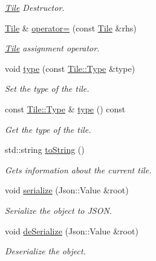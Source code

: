 \begin{DoxyCompactItemize}
\begin{DoxyCompactList}\small\item\em \hyperlink{class_tile}{Tile} Destructor. \end{DoxyCompactList}\item 
\hyperlink{class_tile}{Tile} \& \hyperlink{class_tile_a2e2c020a03afc0cdbe98170a05066d9a}{operator=} (const \hyperlink{class_tile}{Tile} \&rhs)
\begin{DoxyCompactList}\small\item\em \hyperlink{class_tile}{Tile} assignment operator. \end{DoxyCompactList}\item 
void \hyperlink{class_tile_af6644c418cbb05f4af1bb0bae756a96f}{type} (const \hyperlink{class_tile_afa5ef05a7f2ea1f3e44398c001abc738}{Tile\-::\-Type} \&type)
\begin{DoxyCompactList}\small\item\em Set the type of the tile. \end{DoxyCompactList}\item 
const \hyperlink{class_tile_afa5ef05a7f2ea1f3e44398c001abc738}{Tile\-::\-Type} \& \hyperlink{class_tile_a816fb8e2d8d48619eccf6e225eca7206}{type} () const 
\begin{DoxyCompactList}\small\item\em Get the type of the tile. \end{DoxyCompactList}\item 
std\-::string \hyperlink{class_tile_acc5f775cb013360f669f5043cbf60cb2}{to\-String} ()
\begin{DoxyCompactList}\small\item\em Gets information about the current tile. \end{DoxyCompactList}\item 
\hypertarget{class_tile_a236311185e4c94d0ceb21bb6d122c4f8}{void \hyperlink{class_tile_a236311185e4c94d0ceb21bb6d122c4f8}{serialize} (Json\-::\-Value \&root)}\label{class_tile_a236311185e4c94d0ceb21bb6d122c4f8}

\begin{DoxyCompactList}\small\item\em Serialize the object to J\-S\-O\-N. \end{DoxyCompactList}\item 
\hypertarget{class_tile_aac6ff96901aa89ac87b1a8385dc6444d}{void \hyperlink{class_tile_aac6ff96901aa89ac87b1a8385dc6444d}{de\-Serialize} (Json\-::\-Value \&root)}\label{class_tile_aac6ff96901aa89ac87b1a8385dc6444d}

\begin{DoxyCompactList}\small\item\em Deserialize the object. \end{DoxyCompactList}\end{DoxyCompactItemize}
